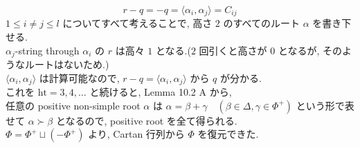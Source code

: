 \documentclass[uplatex,dvipdfmx]{jsarticle}
\begin{document}
\begin{equation*}
    r - q = -q = \langle \alpha_i, \alpha_j \rangle = C_{ij}
\end{equation*}
$1 \le i \neq j \le l$ についてすべて考えることで, 高さ $2$ のすべてのルート $\alpha$ を書き下せる.\\
$\alpha_j$-string through $\alpha_i$ の $r$ は高々 $1$ となる.($2$ 回引くと高さが $0$ となるが, そのようなルートはないため.)\\
$\langle \alpha_i, \alpha_j \rangle$ は計算可能なので, $r-q = \langle \alpha_i, \alpha_j \rangle$ から $q$ が分かる.\\
これを $\mathrm{ht} = 3, 4, \dots$ と続けると, Lemma 10.2 A から, \\
任意の positive non-simple root $\alpha$ は $\alpha = \beta + \gamma \quad (\beta \in \Delta, \gamma \in \Phi^+)$ という形で表せて $\alpha \succ \beta$ となるので, positive root を全て得られる.\\
$\Phi = \Phi^+ \sqcup (-\Phi^+)$ より, Cartan 行列から $\Phi$ を復元できた.
\end{document}
